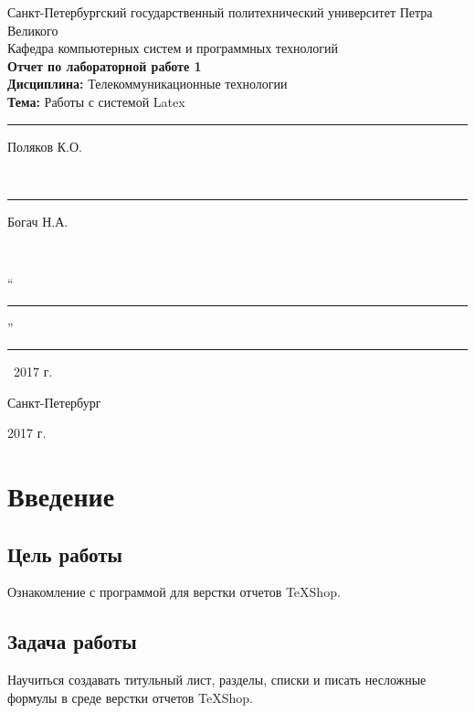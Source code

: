 \documentclass[10pt,a4paper]{report}
\begin{document}
	\begin{titlepage}
		\begin{center}
			Санкт-Петербургский государственный политехнический университет Петра Великого \\
			Кафедра компьютерных систем и программных технологий \\[7cm]
			
			\textbf{Отчет по лабораторной работе 1}\\[0.1cm]
			\textbf{Дисциплина:} Телекоммуникационные технологии \\[0.1cm]
			\textbf{Тема:} Работы с системой Latex \\[3cm]
		\end{center}
		
		\vfill
		
		 \hfill\parbox{8cm}{
			\hspace*{3cm}\hspace*{-0.8cm}\rule{3cm}{0.8pt} Поляков К.О.}\\[0.6cm]
		
		 \hfill\parbox{8cm}{
			\hspace*{3cm}\hspace*{-0.8cm}\rule{3cm}{0.8pt} Богач Н.А.}\\[0.6cm]
		
		\hfill\parbox{9cm}{\hspace*{3cm}``\rule{0.7cm}{0.8pt}''\rule{3cm}{0.8pt}~2017 г.}
		\vfill
		
		
		\begin{center}
			Санкт-Петербург \par
			2017 г.
		\end{center}
	\end{titlepage}
	\setcounter{page}{2}
	
\pagebreak

\chapter{Введение}
\section{Цель работы}
Ознакомление с программой для верстки отчетов TeXShop.
\section{Задача работы}
Научиться создавать титульный лист, разделы, списки и писать несложные формулы в среде верстки отчетов TeXShop.
\end{document}
